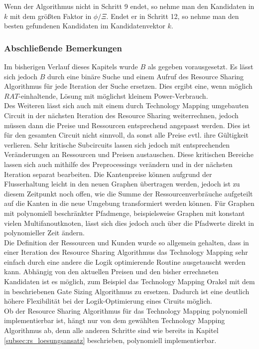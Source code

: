 \documentclass[11pt, a4paper, german]{article}
\newcommand{\TM}{Technology  Mapping }
\begin{document}
Wenn der Algorithmus nicht in Schritt 9 endet, so nehme man den Kandidaten in $k$ mit dem größten Faktor in ${\phi}/{\Xi}$.  Endet er in Schritt 12, so nehme man den besten gefundenen Kandidaten im Kandidatenvektor $k$.

\subsubsection{Abschließende Bemerkungen}
Im bisherigen Verlauf dieses Kapitels wurde $B$ als gegeben vorausgesetzt. Es lässt sich jedoch $B$ durch eine binäre Suche und einem Aufruf des Resource Sharing Algorithmus für jede Iteration der Suche ersetzen. Dies ergibt eine, wenn möglich $RAT$-einhaltende, Lösung mit möglichst kleinem Power-Verbrauch. \\
Des Weiteren lässt sich auch mit einem durch \TM umgebauten Circuit in der nächsten Iteration des Resource Sharing weiterrechnen, jedoch müssen dann die Preise und Ressourcen entsprechend angepasst werden. Dies ist für den gesamten Circuit nicht sinnvoll, da sonst alle Preise evtl. ihre Gültigkeit verlieren. Sehr kritische Subcircuits lassen sich jedoch  mit entsprechenden Veränderungen an Ressourcen und Preisen austauschen. Diese kritischen Bereiche lassen sich auch mithilfe des Preprocessings verändern und in der nächsten Iteration separat bearbeiten. Die Kantenpreise können aufgrund der Flusserhaltung leicht in den neuen Graphen übertragen werden, jedoch ist zu diesem Zeitpunkt noch offen, wie die Summe der Ressourcenverbräuche aufgeteilt auf die Kanten in die neue Umgebung transformiert werden können. Für Graphen mit polynomiell beschränkter Pfadmenge, beispielsweise Graphen mit konstant vielen Multifanoutknoten, lässt sich dies jedoch auch über die Pfadwerte direkt in polynomieller Zeit ändern. \\
Die Definition der Ressourcen und Kunden wurde so allgemein gehalten, dass in einer Iteration des Resource Sharing Algorithmus das \TM sehr einfach durch eine andere die Logik optimierende Routine ausgetauscht werden kann. Abhängig von den aktuellen Preisen und den bisher errechneten Kandidaten ist es möglich, zum Beispiel das \TM Orakel mit  dem  in \cite{Daboul2018} beschriebenen  Gate Sizing Algorithmus zu ersetzen.  Dadurch ist eine deutlich höhere Flexibilität bei der Logik-Optimierung eines Ciruits möglich. \\
Ob der Resource Sharing Algorithmus für das \TM polynomiell implementierbar ist, hängt nur von dem gewählten \TM Algorithmus ab, denn alle anderen Schritte sind wie bereits in Kapitel \ref{subsec:rs_loesungsansatz} beschrieben, polynomiell implementierbar. 
\end{document}
